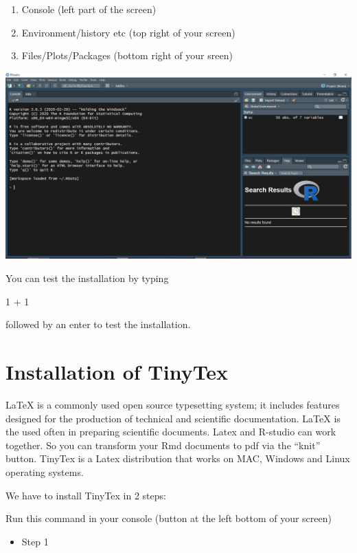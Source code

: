 \documentclass[
]{book}
\providecommand{\tightlist}{%
  \setlength{\itemsep}{0pt}\setlength{\parskip}{0pt}}
\begin{document}
\begin{enumerate}
\def\labelenumi{\arabic{enumi}.}
\tightlist
\item
  Console (left part of the screen)
\item
  Environment/history etc (top right of your screen)
\item
  Files/Plots/Packages (bottom right of your sreen)
\end{enumerate}

\includegraphics{Rstudio.PNG}

You can test the installation by typing

1 + 1

followed by an enter to test the installation.

\hypertarget{installation-of-tinytex}{%
\section{Installation of TinyTex}\label{installation-of-tinytex}}

LaTeX is a commonly used open source typesetting system; it includes features designed for the production of technical and scientific documentation. LaTeX is the used often in preparing scientific documents.
Latex and R-studio can work together. So you can transform your Rmd documents to pdf via the ``knit'' button.
TinyTex is a Latex distribution that works on MAC, Windows and Linux operating systems.

We have to install TinyTex in 2 steps:

Run this command in your console (button at the left bottom of your screen)

\begin{itemize}
\tightlist
\item
  Step 1
\end{itemize}
\end{document}
